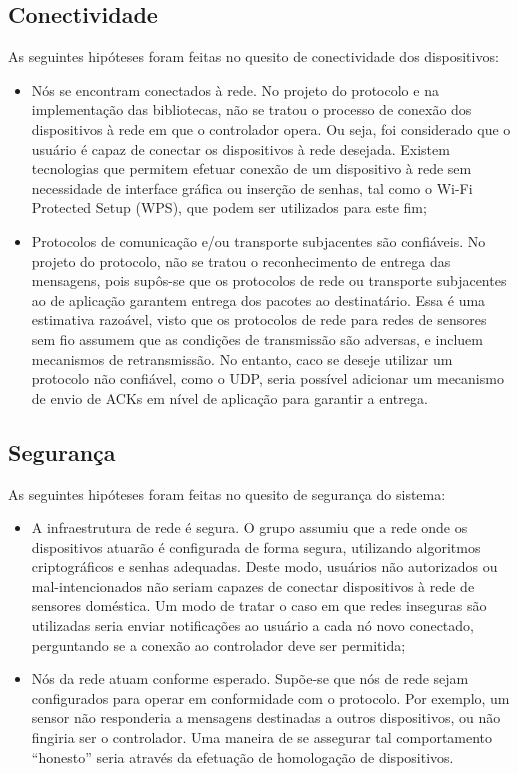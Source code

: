 \subsection{Conectividade} \label{subsec:limit_conectividade}
As seguintes hipóteses foram feitas no quesito de conectividade dos dispositivos:
\begin{itemize}
	\item Nós se encontram conectados à rede. No projeto do protocolo e na implementação das bibliotecas, não se tratou o processo de conexão dos dispositivos à rede em que o controlador opera. Ou seja, foi considerado que o usuário é capaz de conectar os dispositivos à rede desejada. Existem tecnologias que permitem efetuar conexão de um dispositivo à rede sem necessidade de interface gráfica ou inserção de senhas, tal como o Wi-Fi Protected Setup (WPS), que podem ser utilizados para este fim;
	\item Protocolos de comunicação e/ou transporte subjacentes são confiáveis. No projeto do protocolo, não se tratou o reconhecimento de entrega das mensagens, pois supôs-se que os protocolos de rede ou transporte subjacentes ao de aplicação garantem entrega dos pacotes ao destinatário. Essa é uma estimativa razoável, visto que os protocolos de rede para redes de sensores sem fio assumem que as condições de transmissão são adversas, e incluem mecanismos de retransmissão. No entanto, caco se deseje utilizar um protocolo não confiável, como o UDP, seria possível adicionar um mecanismo de envio de ACKs em nível de aplicação para garantir a entrega.
\end{itemize}

\subsection{Segurança} \label{subsec:limit_seguranca}
As seguintes hipóteses foram feitas no quesito de segurança do sistema:
\begin{itemize}
	\item A infraestrutura de rede é segura. O grupo assumiu que a rede onde os dispositivos atuarão é configurada de forma segura, utilizando algoritmos criptográficos e senhas adequadas. Deste modo, usuários não autorizados ou mal-intencionados não seriam capazes de conectar dispositivos à rede de sensores doméstica. Um modo de tratar o caso em que redes inseguras são utilizadas seria enviar notificações ao usuário a cada nó novo conectado, perguntando se a conexão ao controlador deve ser permitida;
	\item Nós da rede atuam conforme esperado. Supõe-se que nós de rede sejam configurados para operar em conformidade com o protocolo. Por exemplo, um sensor não responderia a mensagens destinadas a outros dispositivos, ou não fingiria ser o controlador. Uma maneira de se assegurar tal comportamento ``honesto'' seria através da efetuação de homologação de dispositivos.
\end{itemize}